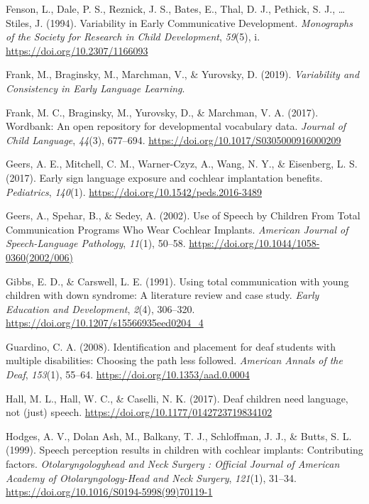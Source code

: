 \documentclass[english,man]{apa6}
\begin{document}
\leavevmode\hypertarget{ref-fenson1994}{}%
Fenson, L., Dale, P. S., Reznick, J. S., Bates, E., Thal, D. J., Pethick, S. J., \ldots{} Stiles, J. (1994). Variability in Early Communicative Development. \emph{Monographs of the Society for Research in Child Development}, \emph{59}(5), i. \url{https://doi.org/10.2307/1166093}

\leavevmode\hypertarget{ref-frank2019}{}%
Frank, M., Braginsky, M., Marchman, V., \& Yurovsky, D. (2019). \emph{Variability and Consistency in Early Language Learning}.

\leavevmode\hypertarget{ref-frank2017}{}%
Frank, M. C., Braginsky, M., Yurovsky, D., \& Marchman, V. A. (2017). Wordbank: An open repository for developmental vocabulary data. \emph{Journal of Child Language}, \emph{44}(3), 677--694. \url{https://doi.org/10.1017/S0305000916000209}

\leavevmode\hypertarget{ref-geers2017}{}%
Geers, A. E., Mitchell, C. M., Warner-Czyz, A., Wang, N. Y., \& Eisenberg, L. S. (2017). Early sign language exposure and cochlear implantation benefits. \emph{Pediatrics}, \emph{140}(1). \url{https://doi.org/10.1542/peds.2016-3489}

\leavevmode\hypertarget{ref-geers2002}{}%
Geers, A., Spehar, B., \& Sedey, A. (2002). Use of Speech by Children From Total Communication Programs Who Wear Cochlear Implants. \emph{American Journal of Speech-Language Pathology}, \emph{11}(1), 50--58. \url{https://doi.org/10.1044/1058-0360(2002/006)}

\leavevmode\hypertarget{ref-gibbs1991}{}%
Gibbs, E. D., \& Carswell, L. E. (1991). Using total communication with young children with down syndrome: A literature review and case study. \emph{Early Education and Development}, \emph{2}(4), 306--320. \url{https://doi.org/10.1207/s15566935eed0204_4}

\leavevmode\hypertarget{ref-guardino2008}{}%
Guardino, C. A. (2008). Identification and placement for deaf students with multiple disabilities: Choosing the path less followed. \emph{American Annals of the Deaf}, \emph{153}(1), 55--64. \url{https://doi.org/10.1353/aad.0.0004}

\leavevmode\hypertarget{ref-hall2017}{}%
Hall, M. L., Hall, W. C., \& Caselli, N. K. (2017). Deaf children need language, not (just) speech. \url{https://doi.org/10.1177/0142723719834102}

\leavevmode\hypertarget{ref-hodges1999}{}%
Hodges, A. V., Dolan Ash, M., Balkany, T. J., Schloffman, J. J., \& Butts, S. L. (1999). Speech perception results in children with cochlear implants: Contributing factors. \emph{Otolaryngologyhead and Neck Surgery : Official Journal of American Academy of Otolaryngology-Head and Neck Surgery}, \emph{121}(1), 31--34. \url{https://doi.org/10.1016/S0194-5998(99)70119-1}
\end{document}
